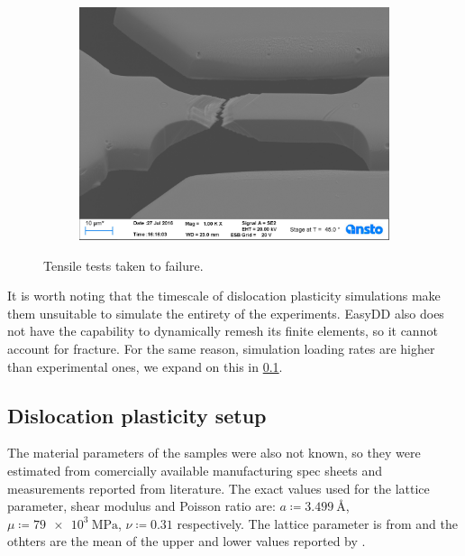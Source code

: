 \begin{figure}
\begin{subfigure}[t]{0.3\linewidth}
        \includegraphics[width=\linewidth]{../data/Ni039.jpg}
    \end{subfigure}
    \caption{Tensile tests taken to failure.}
    \label{f:necking}
\end{figure}

It is worth noting that the timescale of dislocation plasticity simulations make them unsuitable to simulate the entirety of the experiments. EasyDD also does not have the capability to dynamically remesh its finite elements, so it cannot account for fracture. For the same reason, simulation loading rates are higher than experimental ones, we expand on this in \cref{ss:modelSetup}.

\subsection{Dislocation plasticity setup}
\label{ss:modelSetup}

The material parameters of the samples were also not known, so they were estimated from comercially available manufacturing spec sheets and measurements reported from literature. The exact values used for the lattice parameter, shear modulus and Poisson ratio are: $a \coloneqq \SI{3.499}{\angstrom}$, $ \mu  \coloneqq \SI{79e3}{\mega\pascal}$, $\nu \coloneqq 0.31$ respectively. The lattice parameter is from \cite{ni_lattice} and the othters are the mean of the upper and lower values reported by \cite{azom_nickel}.

